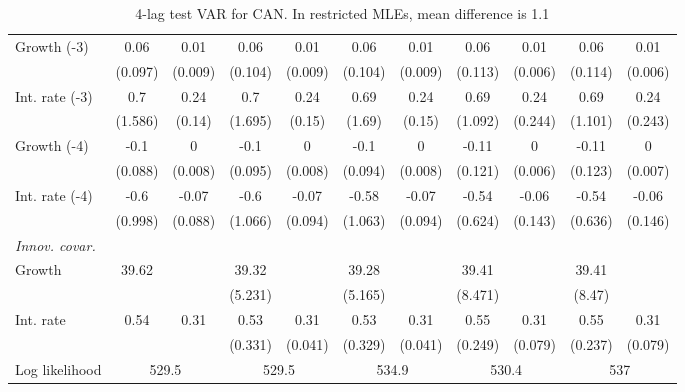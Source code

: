 \begin{table}[htbp]
\begin{tabular}{@{\extracolsep{4pt}}lcccccccccc@{}}
\quad Growth (-3) 	 &0.06 	 & 0.01 	 & 0.06 	 & 0.01 	 & 0.06 	 & 0.01 	 & 0.06 	 & 0.01 	 & 0.06 	 & 0.01	 \\ 
 		 & (0.097) 	 & (0.009) 	 & (0.104) 	 & (0.009) 	 & (0.104) 	 & (0.009) 	 & (0.113) 	 & (0.006) 	 & (0.114) 	 & (0.006) 	 \\ 
\quad Int. rate (-3) 	 &0.7 	 & 0.24 	 & 0.7 	 & 0.24 	 & 0.69 	 & 0.24 	 & 0.69 	 & 0.24 	 & 0.69 	 & 0.24	 \\ 
 		 & (1.586) 	 & (0.14) 	 & (1.695) 	 & (0.15) 	 & (1.69) 	 & (0.15) 	 & (1.092) 	 & (0.244) 	 & (1.101) 	 & (0.243) 	 \\ 
\quad Growth (-4) 	 &-0.1 	 & 0 	 & -0.1 	 & 0 	 & -0.1 	 & 0 	 & -0.11 	 & 0 	 & -0.11 	 & 0	 \\ 
 		 & (0.088) 	 & (0.008) 	 & (0.095) 	 & (0.008) 	 & (0.094) 	 & (0.008) 	 & (0.121) 	 & (0.006) 	 & (0.123) 	 & (0.007) 	 \\ 
\quad Int. rate (-4) 	 &-0.6 	 & -0.07 	 & -0.6 	 & -0.07 	 & -0.58 	 & -0.07 	 & -0.54 	 & -0.06 	 & -0.54 	 & -0.06	 \\ 
 		 & (0.998) 	 & (0.088) 	 & (1.066) 	 & (0.094) 	 & (1.063) 	 & (0.094) 	 & (0.624) 	 & (0.143) 	 & (0.636) 	 & (0.146) 	 \\ 
\rule{0pt}{4ex} \emph{Innov. covar.}  	 & 	 & 	 & 	 & 	 & 	 & 	 & 	 & 	 & 	 &\\ 
\quad Growth 	 &39.62 	 &  	 & 39.32 	 &  	 & 39.28 	 &  	 & 39.41 	 &  	 & 39.41 	 & 	 \\ 
 		 &  	 &  	 & (5.231) 	 &  	 & (5.165) 	 &  	 & (8.471) 	 &  	 & (8.47) 	 &  	 \\ 
\quad Int. rate 	 &0.54 	 & 0.31 	 & 0.53 	 & 0.31 	 & 0.53 	 & 0.31 	 & 0.55 	 & 0.31 	 & 0.55 	 & 0.31	 \\ 
 		 &  	 &  	 & (0.331) 	 & (0.041) 	 & (0.329) 	 & (0.041) 	 & (0.249) 	 & (0.079) 	 & (0.237) 	 & (0.079) 	 \\ 
 \hline \rule{0pt}{4ex} 
  Log likelihood 	 &\multicolumn{2}{c}{529.5} 	 & \multicolumn{2}{c}{529.5} 	 & \multicolumn{2}{c}{534.9} 	 & \multicolumn{2}{c}{530.4} 	 & \multicolumn{2}{c}{537}\\ 

 \hline 	\end{tabular}		\caption{4-lag test VAR for CAN. In restricted MLEs, mean difference is 1.1}
		\label{tab:CAN4}

\end{table}
